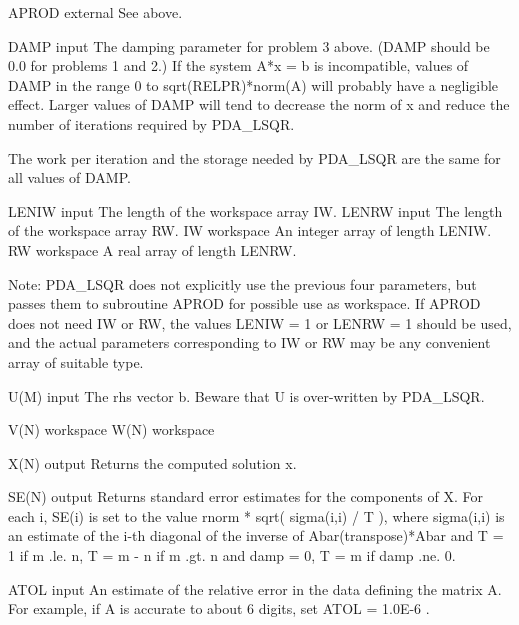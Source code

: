 \documentclass[11pt,twoside,nolof]{starlink}
\begin{document}
\begin{terminalv}
     APROD   external   See above.

     DAMP    input      The damping parameter for problem 3 above.
                        (DAMP should be 0.0 for problems 1 and 2.)
                        If the system A*x = b is incompatible, values
                        of DAMP in the range 0 to sqrt(RELPR)*norm(A)
                        will probably have a negligible effect.
                        Larger values of DAMP will tend to decrease
                        the norm of x and reduce the number of
                        iterations required by PDA_LSQR.

                        The work per iteration and the storage needed
                        by PDA_LSQR are the same for all values of DAMP.

     LENIW   input      The length of the workspace array IW.
     LENRW   input      The length of the workspace array RW.
     IW      workspace  An integer array of length LENIW.
     RW      workspace  A real array of length LENRW.

             Note:  PDA_LSQR  does not explicitly use the previous four
             parameters, but passes them to subroutine APROD for
             possible use as workspace.  If APROD does not need
             IW or RW, the values LENIW = 1 or LENRW = 1 should
             be used, and the actual parameters corresponding to
             IW or RW  may be any convenient array of suitable type.

     U(M)    input      The rhs vector b.  Beware that U is
                        over-written by PDA_LSQR.

     V(N)    workspace
     W(N)    workspace

     X(N)    output     Returns the computed solution x.

     SE(N)   output     Returns standard error estimates for the
                        components of X.  For each i, SE(i) is set
                        to the value  rnorm * sqrt( sigma(i,i) / T ),
                        where sigma(i,i) is an estimate of the i-th
                        diagonal of the inverse of Abar(transpose)*Abar
                        and  T = 1      if  m .le. n,
                             T = m - n  if  m .gt. n  and  damp = 0,
                             T = m      if  damp .ne. 0.

     ATOL    input      An estimate of the relative error in the data
                        defining the matrix A.  For example,
                        if A is accurate to about 6 digits, set
                        ATOL = 1.0E-6 .


\end{terminalv}
\end{document}
